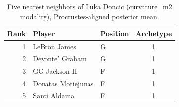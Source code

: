 \begin{table}[htbp]
  \centering\small
  \begin{tabular}{rllc}
    \toprule
    Rank & Player & Position & Archetype \\
    \midrule
    1 & LeBron James & G & 1 \\
    2 & Devonte' Graham & G & 1 \\
    3 & GG Jackson II & F & 1 \\
    4 & Donatas Motiejunas & F & 1 \\
    5 & Santi Aldama & F & 1 \\
    \bottomrule
  \end{tabular}
  \caption{Five nearest neighbors of Luka Doncic (curvature_m2 modality), Procrustes-aligned posterior mean.}
  \label{tab:Luka_Doncic_neighbors_curvature_m2}
\end{table}

